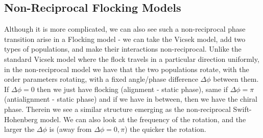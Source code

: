 \subsection{Non-Reciprocal Flocking Models}
Although it is more complicated, we can also see such a non-reciprocal phase transition arise in a Flocking model - we can take the Vicsek model, add two types of populations, and make their interactions non-reciprocal. Unlike the standard Vicsek model where the flock travels in a particular direction uniformly, in the non-reciprocal model we have that the two populations rotate, with the order parameters rotating, with a fixed angle/phase difference $\Delta \phi$ between them. If $\Delta \phi = 0$ then we just have flocking (alignment - static phase), same if $\Delta \phi =\pi$ (antialignment - static phase) and if we have in between, then we have the chiral phase. Therein we see a similar structure emerging as the non-reciprocal Swift-Hohenberg model. We can also look at the frequency of the rotation, and the larger the $\Delta \phi$ is (away from $\Delta \phi = 0, \pi$) the quicker the rotation.

